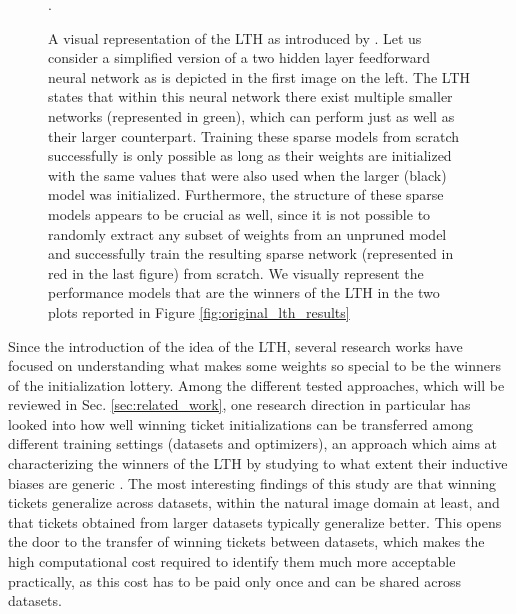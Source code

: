 \begin{figure}[!htb]
\endminipage
\caption{A visual representation of the LTH as introduced by \citet{frankle2018lottery}. Let us consider a simplified version of a two hidden layer feedforward neural network as is depicted in the first image on the left. The LTH states that within this neural network there exist multiple smaller networks (represented in green), which can perform just as well as their larger counterpart. Training these sparse models from scratch successfully is only possible as long as their weights are initialized with the same values that were also used when the larger (black) model was initialized. Furthermore, the structure of these sparse models appears to be crucial as well, since it is not possible to randomly extract any subset of weights from an unpruned model and successfully train the resulting sparse network (represented in red in the last figure) from scratch. We visually represent the performance models that are the winners of the LTH in the two plots reported in Figure \ref{fig:original_lth_results}}.	
\label{fig:tickets_visualization}
\end{figure}



Since the introduction of the idea of the LTH, several research works have focused on understanding what makes some weights so special to be the winners of the initialization lottery. Among the different tested approaches, which will be reviewed in Sec. \ref{sec:related_work}, one research direction in particular has looked into how well winning ticket initializations can be transferred among different training settings (datasets and optimizers), an approach which aims at characterizing the winners of the LTH by studying to what extent their inductive biases are generic \cite{morcos2019one}. The most interesting findings of this study are that winning tickets generalize across datasets, within the natural image domain at least, and that tickets obtained from larger datasets typically generalize better. This opens the door to the transfer of winning tickets between datasets, which makes the high computational cost required to identify them much more acceptable practically, as this cost has to be paid only once and can be shared across datasets.

